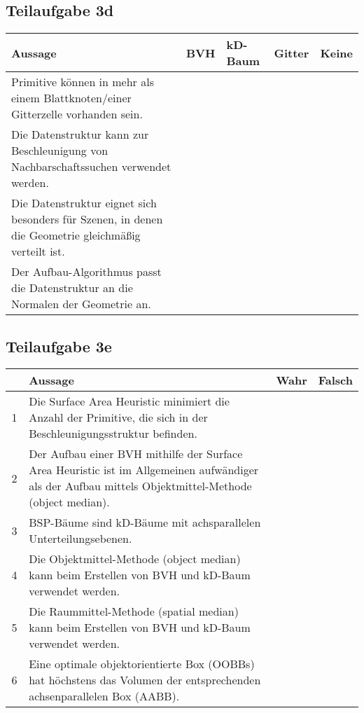 \documentclass[a4paper]{scrartcl}
\begin{document}
\subsection*{Teilaufgabe 3d}
\begin{tabular}{p{7cm}p{1.5cm}p{1.5cm}p{1.5cm}p{1.5cm}}\toprule
	\textbf{Aussage}                                                                                     & \textbf{BVH} & \textbf{kD-Baum} & \textbf{Gitter} & \textbf{Keine} \\\midrule
	Primitive können in mehr als einem Blattknoten/einer Gitterzelle vorhanden sein.                     & \CheckedBox  & \CheckedBox      & \CheckedBox     & \Square        \\
	Die Datenstruktur kann zur Beschleunigung von Nachbarschaftssuchen verwendet werden.                 & \Square      & \Square          & \CheckedBox     & \Square        \\
	Die Datenstruktur eignet sich besonders für Szenen, in denen die Geometrie gleichmäßig verteilt ist. & \Square      & \Square          & \CheckedBox     & \Square        \\
	Der Aufbau-Algorithmus passt die Datenstruktur an die Normalen der Geometrie an.                     & \Square      & \Square          & \Square         & \CheckedBox    \\\bottomrule
\end{tabular}

\subsection*{Teilaufgabe 3e}
\begin{tabular}{cp{12cm}ll}\toprule
	~ & \textbf{Aussage} & \textbf{Wahr} & \textbf{Falsch} \\\midrule
	1 & Die Surface Area Heuristic minimiert die Anzahl der Primitive, die sich in der Beschleunigungsstruktur befinden.
	  & \Square     & \CheckedBox \\
	2 & Der Aufbau einer BVH mithilfe der Surface Area Heuristic ist im Allgemeinen aufwändiger als der Aufbau mittels Objektmittel-Methode (object median).
	  & \CheckedBox & \Square     \\
	3 & BSP-Bäume sind kD-Bäume mit achsparallelen Unterteilungsebenen.
	  & \Square     & \CheckedBox \\
	4 & Die Objektmittel-Methode (object median) kann beim Erstellen von BVH und kD-Baum verwendet werden.
	  & \CheckedBox & \Square     \\
	5 & Die Raummittel-Methode (spatial median) kann beim Erstellen von BVH und kD-Baum verwendet werden.
	  & \CheckedBox & \Square     \\
	6 & Eine optimale objektorientierte Box (OOBBs) hat höchstens das Volumen der entsprechenden achsenparallelen Box (AABB).
	  & \CheckedBox & \Square     \\\bottomrule
\end{tabular}
\end{document}

